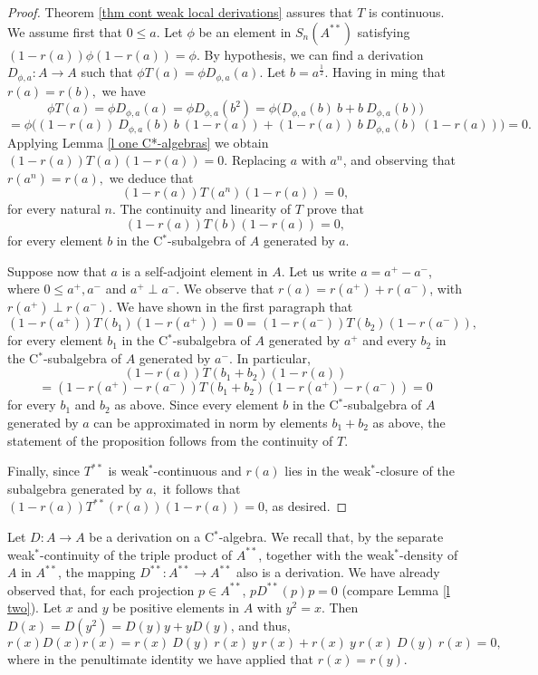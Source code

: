 \documentclass[11pt]{amsart}
\begin{document}
\begin{proof} Theorem \ref{thm cont weak local derivations} assures that $T$ is continuous. We assume first that $0\leq a$. Let $\phi$ be an element in $S_{n} (A^{**}) $ satisfying $(1-r(a)) \phi (1-r(a))= \phi.$ By hypothesis, we can find a derivation $D_{\phi,a} : A\to A$ such that $\phi T(a) = \phi D_{\phi,a} (a) .$ Let $b= a^{\frac12}.$ Having in ming that $r(a) = r(b),$ we have $$\phi T(a) = \phi D_{\phi,a} (a)  =  \phi D_{\phi,a} (b^2) = \phi \Big(D_{\phi,a} (b) \ b + b\  D_{\phi ,a} (b)\Big) $$ $$ = \phi \Big((1-r(a)) \ D_{\phi,a} (b)\  b \ (1-r(a))+ (1-r(a))\  b\ D_{\phi ,a} (b)\ (1-r(a))\Big) = 0.$$ Applying Lemma \ref{l one C*-algebras} we obtain $(1-r(a)) T (a) (1-r(a)) =0.$ Replacing $a$ with $a^{n}$, and observing that $r(a^{n}) = r(a),$ we deduce that $$(1-r(a)) T (a^{n}) (1-r(a)) =0,$$ for every natural $n$. The continuity and linearity of $T$ prove that $$(1-r(a)) T (b) (1-r(a)) =0,$$ for every element $b$ in the C$^*$-subalgebra of $A$ generated by $a$.\smallskip

Suppose now that $a$ is a self-adjoint element in  $A$. Let us write $a= a^{+}- a^{-}$, where $0\leq a^{+},a^{-}$ and $a^{+}\perp a^{-}$. We observe that $r(a) = r(a^{+})+r(a^{-})$, with $r(a^{+})\perp r(a^{-})$. We have shown in the first paragraph that $$(1-r(a^{+})) T (b_1) (1-r(a^{+})) =0 = (1-r(a^{-})) T (b_2) (1-r(a^{-})),$$ for every element $b_1$ in the C$^*$-subalgebra of $A$ generated by $a^{+}$ and every $b_2$ in the C$^*$-subalgebra of $A$ generated by $a^{-}$. In particular, $$ (1-r(a)) T (b_1+b_2) (1-r(a))  $$ $$= (1-r(a^{+})-r(a^{-})) T (b_1+b_2) (1-r(a^{+})-r(a^{-})) =0$$
for every $b_1$ and $b_2$ as above. Since every element $b$ in the C$^*$-subalgebra of $A$ generated by $a$ can be approximated in norm by elements $b_1+b_2$ as above, the statement of the proposition follows from the continuity of $T$. \smallskip

Finally, since $T^{**}$ is weak$^*$-continuous and $r(a)$ lies in the weak$^*$-closure of the subalgebra generated by $a,$ it follows that $(1-r(a)) T^{**} (r(a)) (1-r(a)) =0$, as desired.\end{proof}

Let $D: A\to A$ be a derivation on a C$^*$-algebra. We recall that, by the separate weak$^*$-continuity of the triple product of $A^{**}$, together with the weak$^*$-density of $A$ in $A^{**}$, the mapping $D^{**}: A^{**}\to A^{**}$ also is a derivation. We have already observed that, for each projection $p\in A^{**}$, $p D^{**} (p) p =0 $ (compare Lemma \ref{l two}). Let $x$ and $y$ be positive elements in $A$ with $y^2 = x$. Then $D(x) = D(y^2) = D(y) y + y D(y)$, and thus, \begin{equation}\label{eq new range outer derivation}
r(x) D(x) r(x) = r(x)\ D(y)\ r(x)\ y\ r(x)+ r(x)\ y\ r(x)\ D(y)\ r(x) = 0,
\end{equation} where in the penultimate identity we have applied that $r(x) = r(y)$.
\end{document}
